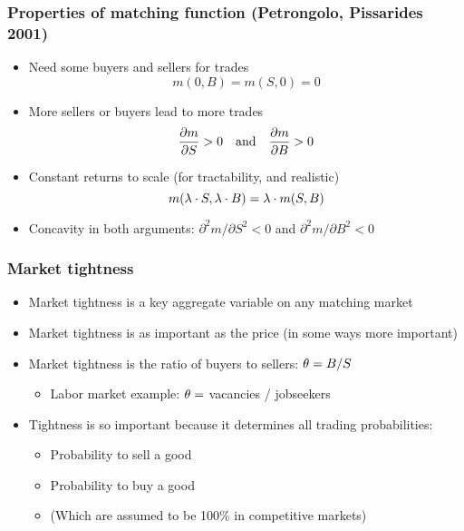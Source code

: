 \documentclass[11pt,aspectratio=169,xcolor={dvipsnames},hyperref={pdftex,pdfpagemode=UseNone,hidelinks,pdfdisplaydoctitle=true},usepdftitle=false]{beamer}
\begin{document}
\begin{frame}
\frametitle{Properties of matching function (Petrongolo, Pissarides 2001)}
\begin{itemize}
\item Need some buyers and sellers for trades
\begin{equation*}
	m(0,B) = m(S,0) = 0
\end{equation*}
\item More sellers or buyers lead to more trades
\begin{equation*}
\pd{m}{S}>0 \quad\text{and}\quad \pd{m}{B}>0
\end{equation*}
\item Constant returns to scale (for tractability, and realistic)
\begin{equation*}
m(\lambda \cdot S, \lambda \cdot B) = \lambda\cdot m(S,B)
\end{equation*}
\item Concavity in both arguments: $\partial^2 m/\partial S^2<0$ and  $\partial^2 m/\partial B^2<0$
\end{itemize}	
\end{frame}

\begin{frame}
\frametitle{Market tightness}
\begin{itemize}
\item Market tightness is a key aggregate variable on any matching market
\item Market tightness is as important as the price (in some ways more important)
\item Market tightness is the ratio of buyers to sellers: $\theta = B/S$ 
\begin{itemize}
	\item  Labor market example: $\theta = $ vacancies / jobseekers
\end{itemize}
\item Tightness is so important because it determines all trading probabilities:
\begin{itemize}
	\item Probability to sell a good
	\item Probability to buy a good
	\item (Which are assumed to be 100\% in competitive markets)
\end{itemize}
\end{itemize}	
\end{frame}
\end{document}

